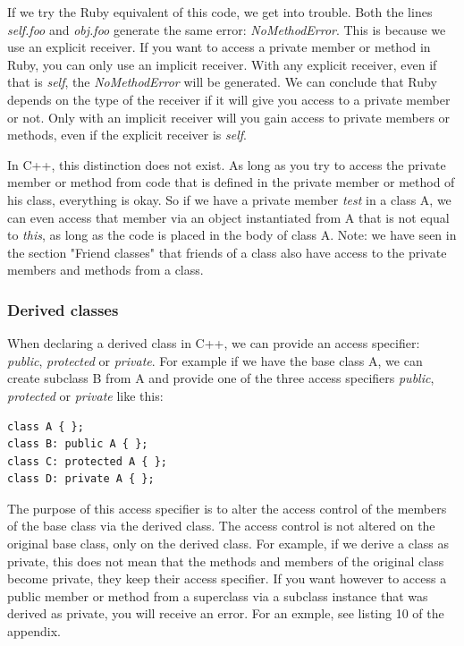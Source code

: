 \documentclass[10pt,a4paper,twocolumn]{article}
\begin{document}
If we try the Ruby equivalent of this code, we get into trouble. Both the lines \textit{self.foo} and \textit{obj.foo} generate the same error: \textit{NoMethodError}. This is because we use an explicit receiver. If you want to access a private member or method in Ruby, you can only use an implicit receiver. With any explicit receiver, even if that is \textit{self}, the \textit{NoMethodError} will be generated. We can conclude that Ruby depends on the type of the receiver if it will give you access to a private member or not. Only with an implicit receiver will you gain access to private members or methods, even if the explicit receiver is \textit{self}.

In C++, this distinction does not exist. As long as you try to access the private member or method from code that is defined in the private member or method of his class, everything is okay. So if we have a private member \textit{test} in a class A, we can even access that member via an object instantiated from A that is not equal to \textit{this}, as long as the code is placed in the body of class A. Note: we have seen in the section "Friend classes" that friends of a class also have access to the private members and methods from a class.

\subsubsection{Derived classes}
When declaring a derived class in C++, we can provide an access specifier: \textit{public}, \textit{protected} or \textit{private}. For example if we have the base class A, we can create subclass B from A and provide one of the three access specifiers \textit{public}, \textit{protected} or \textit{private} like this:

\begin{lstlisting}
class A { };
class B: public A { };
class C: protected A { };
class D: private A { };
\end{lstlisting}

The purpose of this access specifier is to alter the access control of the members of the base class via the derived class. The access control is not altered on the original base class, only on the derived class. For example, if we derive a class as private, this does not mean that the methods and members of the original class become private, they keep their access specifier. If you want however to access a public member or method from a superclass via a subclass instance that was derived as private, you will receive an error. For an exmple, see listing 10 of the appendix.
\end{document}
